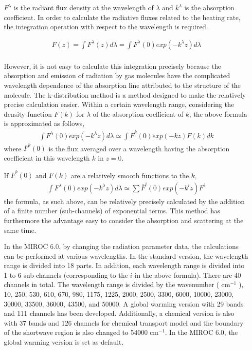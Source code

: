 \(F^{\lambda}\) is the radiant flux density at the wavelength of
\(\lambda\) and \(k^{\lambda}\) is the absorption coefficient. In order
to calculate the radiative fluxes related to the heating rate, the
integration operation with respect to the wavelength is required.

\begin{eqnarray}
  F(z) = \int F^\lambda(z) d \lambda= \int F^\lambda(0) exp (-k^\lambda z) d \lambda \label{p-rad:beer}\\
\end{eqnarray}

However, it is not easy to calculate this integration precisely because
the absorption and emission of radiation by gas molecules have the
complicated wavelength dependence of the absorption line attributed to
the structure of the molecule. The k-distribution method is a method
designed to make the relatively precise calculation easier. Within a
certain wavelength range, considering the density function \(F(k)\) for
\(\lambda\) of the absorption coefficient of \(k\), the above formula is
approximated as follows, \begin{eqnarray}
 \int F^\lambda(0) exp (-k^\lambda z) d \lambda
 \simeq \int \bar{F}^k(0) exp (-k z) F(k) dk
\end{eqnarray} where \(\bar{F}^k(0)\) is the flux averaged over a wavelength having
the absorption coefficient in this wavelength \(k\) in \(z=0\).

If \(\bar{F}^k(0)\) and \(F(k)\) are a relatively smooth functions to
the \(k\), \begin{eqnarray}
 \int F^\lambda(0) exp (-k^\lambda z) d \lambda
 \simeq \sum \bar{F}^i(0) exp (-k^i z) F^i
\end{eqnarray} the formula, as such above, can be relatively precisely calculated by
the addition of a finite number (sub-channels) of exponential terms.
This method has furthermore the advantage easy to consider the
absorption and scattering at the same time.

In the MIROC 6.0, by changing the radiation parameter data, the
calculations can be performed at various wavelengths. In the standard
version, the wavelength range is divided into 18 parts. In addition,
each wavelength range is divided into 1 to 6 sub-channels (corresponding
to the \(i\) in the above formula). There are 40 channels in total. The
wavelength range is divided by the wavenumber ( \(\mathrm{cm}^{-1}\) ),
10, 250, 530, 610, 670, 980, 1175, 1225, 2000, 2500, 3300, 6000, 10000,
23000, 30000, 33500, 36000, 43500, and 50000. A global warming version
with 29 bands and 111 channels has been developed. Additionally, a
chemical version is also with 37 bands and 126 channels for chemical
transport model and the boundary of the shortwave region is also changed
to 54000 \(\mathrm{cm}^{-1}\). In the MIROC 6.0, the global warming
version is set as default.

